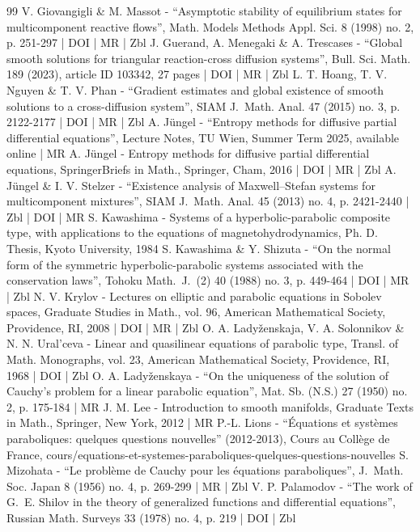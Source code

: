 \documentclass[10pt]{amsart}
\theoremstyle{definition}
\begin{document}
\begin{thebibliography}{99}
V. Giovangigli \& M. Massot - “Asymptotic stability of equilibrium states for multicomponent reactive flows”, Math. Models Methods Appl. Sci. 8 (1998) no. 2, p. 251-297 | DOI | MR | Zbl
J. Guerand, A. Menegaki \& A. Trescases - “Global smooth solutions for triangular reaction-cross diffusion systems”, Bull. Sci. Math. 189 (2023), article ID 103342, 27 pages | DOI | MR | Zbl
L. T. Hoang, T. V. Nguyen \& T. V. Phan - “Gradient estimates and global existence of smooth solutions to a cross-diffusion system”, SIAM J. Math. Anal. 47 (2015) no. 3, p. 2122-2177 | DOI | MR | Zbl
A. Jüngel - “Entropy methods for diffusive partial differential equations”, Lecture Notes, TU Wien, Summer Term 2025, available online | MR
A. Jüngel - Entropy methods for diffusive partial differential equations, SpringerBriefs in Math., Springer, Cham, 2016 | DOI | MR | Zbl
A. Jüngel \& I. V. Stelzer - “Existence analysis of Maxwell–Stefan systems for multicomponent mixtures”, SIAM J. Math. Anal. 45 (2013) no. 4, p. 2421-2440 | Zbl | DOI | MR
S. Kawashima - Systems of a hyperbolic-parabolic composite type, with applications to the equations of magnetohydrodynamics, Ph. D. Thesis, Kyoto University, 1984
S. Kawashima \& Y. Shizuta - “On the normal form of the symmetric hyperbolic-parabolic systems associated with the conservation laws”, Tohoku Math. J. (2) 40 (1988) no. 3, p. 449-464 | DOI | MR | Zbl
N. V. Krylov - Lectures on elliptic and parabolic equations in Sobolev spaces, Graduate Studies in Math., vol. 96, American Mathematical Society, Providence, RI, 2008 | DOI | MR | Zbl
O. A. Ladyženskaja, V. A. Solonnikov \& N. N. Ural'ceva - Linear and quasilinear equations of parabolic type, Transl. of Math. Monographs, vol. 23, American Mathematical Society, Providence, RI, 1968 | DOI | Zbl
O. A. Ladyženskaya - “On the uniqueness of the solution of Cauchy’s problem for a linear parabolic equation”, Mat. Sb. (N.S.) 27 (1950) no. 2, p. 175-184 | MR
J. M. Lee - Introduction to smooth manifolds, Graduate Texts in Math., Springer, New York, 2012 | MR
P.-L. Lions - “Équations et systèmes paraboliques: quelques questions nouvelles” (2012-2013), Cours au Collège de France, cours/equations-et-systemes-paraboliques-quelques-questions-nouvelles
S. Mizohata - “Le problème de Cauchy pour les équations paraboliques”, J. Math. Soc. Japan 8 (1956) no. 4, p. 269-299 | MR | Zbl
V. P. Palamodov - “The work of G. E. Shilov in the theory of generalized functions and differential equations”, Russian Math. Surveys 33 (1978) no. 4, p. 219 | DOI | Zbl

\end{thebibliography}
\end{document}
